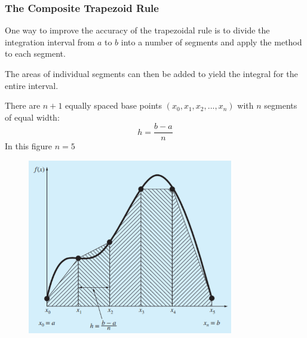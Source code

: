 \documentclass{if-beamer}
\begin{document}
\begin{frame}
	\frametitle{The Composite Trapezoid Rule}
	One way to improve the accuracy of the trapezoidal rule is to divide the integration interval from $a$ to $b$ into a number of segments and apply the method to each segment.\\\vspace{10pt}
	\begin{minipage}{0.5\textwidth}
		The areas of individual segments can then be added to yield the integral for the entire interval.\\\vspace{4pt}
		
		There are $n+1$ equally spaced base points $(x_0,x_1,x_2,...,x_n)$ with $n$ segments of equal width:
		$$h = \frac{b-a}{n}$$
		In this figure $n = 5$
	\end{minipage}
	\begin{minipage}{0.5\textwidth}
		\begin{figure}
			\centering
			\includegraphics[width=0.8\textwidth]{figures/compositeTrap}
		\end{figure}
	\end{minipage}
\end{frame}
\end{document}
